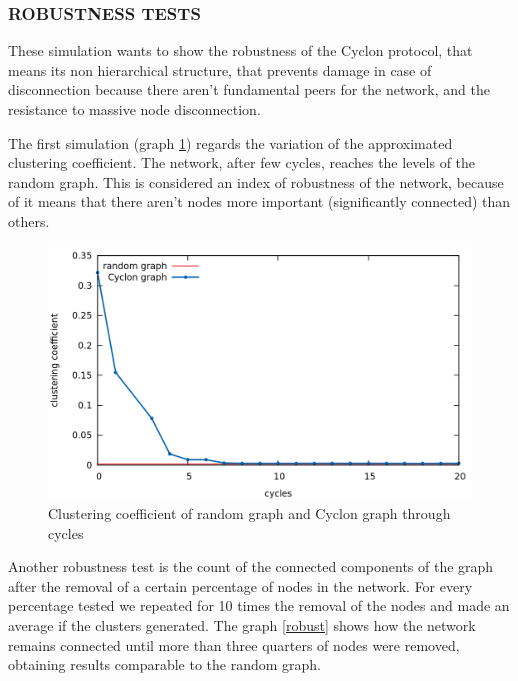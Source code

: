 \documentclass[a4paper,12pt,notitlepage]{article} %
\begin{document}
\subsubsection{ROBUSTNESS TESTS}
These simulation wants to show the robustness of the Cyclon protocol, that means its non
 hierarchical structure, that prevents damage in case of disconnection because there aren't
 fundamental peers for the network, and the resistance to massive node disconnection.

The first simulation (graph \ref{clust}) regards the variation of the approximated clustering coefficient. The network,
 after few cycles, reaches the levels of the random graph. This is considered an index of robustness of the 
 network, because of it means that there aren't nodes more important (significantly connected) than others.

\begin{figure} [H]
	\centering
	\includegraphics[width=1\textwidth]{img/clustering}
	\caption{Clustering coefficient of random graph and Cyclon graph through  cycles }
	\label{clust}
\end{figure}


Another robustness test is the count of the connected components of the graph after the removal of a certain 
 percentage of nodes in the network. For every percentage tested we repeated for 10 times the removal of the
 nodes and made an average if the clusters generated. The graph \ref{robust} shows how the network remains
 connected until more than three quarters of nodes were removed, obtaining results comparable to the random
 graph.
 
\end{document}
